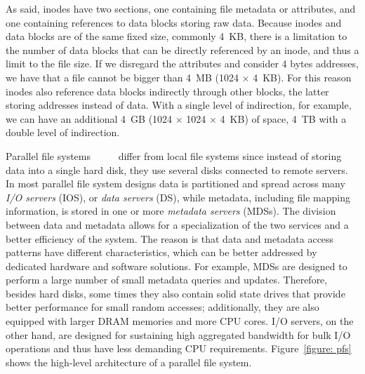 As said, inodes have two sections, one containing file metadata or attributes, and one containing references to data blocks storing raw data. Because inodes and data blocks are of the same fixed size, commonly 4~KB, there 
is a limitation to the number of data blocks that can be directly referenced by an inode, and thus a limit to the file size. If we disregard the attributes and consider 4 bytes addresses, we have that a file cannot be 
bigger than 4~MB (1024 $\times$ 4~KB). For this reason inodes also reference data blocks indirectly through other blocks, the latter storing addresses instead of data. With a single level of indirection, for example, we 
can have an additional 4~GB (1024 $\times$ 1024 $\times$ 4~KB) of space, 4~TB with a double level of indirection.

Parallel file systems~\cite{Braam02}~\cite{SchmuckH02}~\cite{Welch2008}~\cite{CarnsLRT}~\cite{Mcpeek2002} differ from local file systems since instead of storing data into a single hard disk, they use several disks 
connected to remote servers. In most parallel file system designs data is partitioned and spread across many \textit{I/O servers} (IOS), or \textit{data servers} (DS), while metadata, including file mapping information, 
is stored in one or more \textit{metadata servers} (MDSs). The division between data and metadata allows for a specialization of the two services and a better efficiency of the system. The reason is that data and metadata 
access patterns have different characteristics, which can be better addressed by dedicated hardware and software solutions. For example, MDSs are designed to perform a large number of small metadata queries and updates. 
Therefore, besides hard disks, some times they also contain solid state drives that provide better performance for small random accesses; additionally, they are also equipped with larger DRAM memories and more CPU cores. 
I/O servers, on the other hand, are designed for sustaining high aggregated bandwidth for bulk I/O operations and thus have less demanding CPU requirements. Figure~\ref{figure: pfs} shows the high-level architecture of a 
parallel file system.

